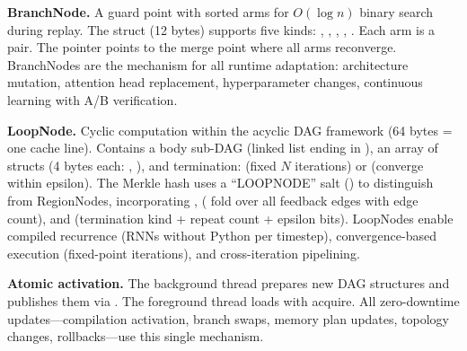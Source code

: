\textbf{BranchNode.}
A guard point with sorted arms for $O(\log n)$ binary search during replay.
The  struct (12 bytes) supports five kinds: , , , , .
Each arm is a  pair.
The  pointer points to the merge point where all arms reconverge.
BranchNodes are the mechanism for all runtime adaptation: architecture mutation, attention head replacement, hyperparameter changes, continuous learning with A/B verification.

\textbf{LoopNode.}
Cyclic computation within the acyclic DAG framework (64 bytes = one cache line).
Contains a body sub-DAG (linked list ending in ), an array of  structs (4 bytes each: , ), and termination:  (fixed $N$ iterations) or  (converge within epsilon).
The Merkle hash uses a ``LOOPNODE'' salt () to distinguish from RegionNodes, incorporating ,  ( fold over all feedback edges with edge count), and  (termination kind + repeat count + epsilon bits).
LoopNodes enable compiled recurrence (RNNs without Python per timestep), convergence-based execution (fixed-point iterations), and cross-iteration pipelining.

\textbf{Atomic activation.}
The background thread prepares new DAG structures and publishes them via .
The foreground thread loads with acquire.
All zero-downtime updates---compilation activation, branch swaps, memory plan updates, topology changes, rollbacks---use this single mechanism.

